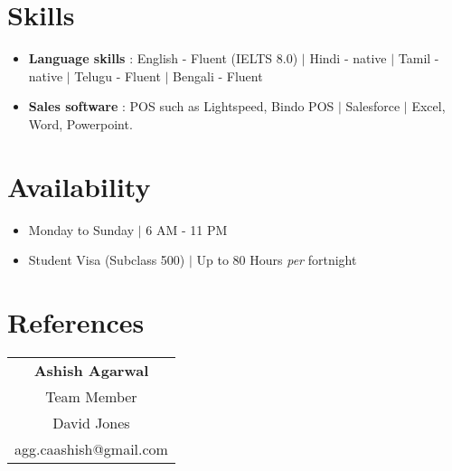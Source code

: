 \documentclass{resume_class}
\begin{document}
\section{Skills}
\begin{itemize}[leftmargin = 10pt , labelsep = 3pt , parsep = 0pt , itemsep = 2pt , label =  {\small $\bullet$} ] 
	\item \mdseries \Large { \textbf{Language skills} : English - Fluent (IELTS 8.0) $|$ Hindi - native $|$ Tamil - native $|$ Telugu - Fluent $|$ Bengali - Fluent   }
	\item \mdseries \Large  {\textbf{Sales software} : POS such as Lightspeed, Bindo POS $|$ Salesforce $|$ Excel, Word, Powerpoint. }
\end{itemize}

\section{Availability }
\begin{itemize}[leftmargin = 10pt , labelsep = 3pt , parsep = 0pt , itemsep = 2pt , label =  {\small $\bullet$} ] 
	\item \mdseries \Large Monday to Sunday $|$ 6 AM - 11 PM
	\item \mdseries \Large Student Visa (Subclass 500)  $|$ Up to 80 Hours \textit{per} fortnight
\end{itemize}
\section{References}
\begin{tabular}{|c|} 
	\textbf{Ashish Agarwal}  \\
	Team Member \\
	David Jones \\
	agg.caashish@gmail.com \\

	
\end{tabular}


	
\end{document}
